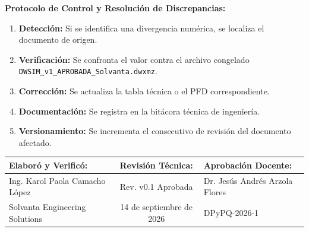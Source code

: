 \documentclass[11pt,letterpaper]{article}
\begin{document}
\vspace{0.3cm}
\noindent\textbf{Protocolo de Control y Resolución de Discrepancias:}
\begin{enumerate}
    \item \textbf{Detección:} Si se identifica una divergencia numérica, se localiza el documento de origen.
    \item \textbf{Verificación:} Se confronta el valor contra el archivo congelado \texttt{DWSIM\_v1\_APROBADA\_Solvanta.dwxmz}.
    \item \textbf{Corrección:} Se actualiza la tabla técnica o el PFD correspondiente.
    \item \textbf{Documentación:} Se registra en la bitácora técnica de ingeniería.
    \item \textbf{Versionamiento:} Se incrementa el consecutivo de revisión del documento afectado.
\end{enumerate}

\vspace{0.5cm}
\begin{center}
\footnotesize
\begin{tabularx}{0.95\textwidth}{XcX}
\toprule
\textbf{Elaboró y Verificó:} & \textbf{Revisión Técnica:} & \textbf{Aprobación Docente:} \\
\midrule
Ing. Karol Paola Camacho López & Rev. v0.1 Aprobada & Dr. Jesús Andrés Arzola Flores \\
Solvanta Engineering Solutions & 14 de septiembre de 2026 & DPyPQ-2026-1 \\
\bottomrule
\end{tabularx}
\end{center}
\end{document}
